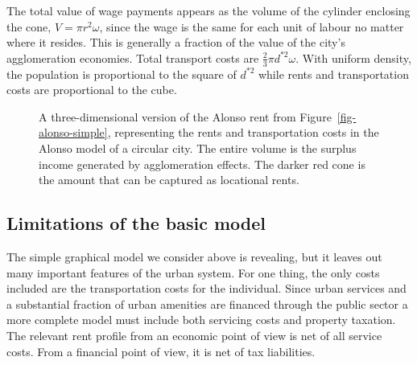 The total value of wage payments appears as the volume of the cylinder enclosing the cone, $V=\pi r^2 \omega$, since the wage is the same for each unit of labour no matter where it resides. This is generally a fraction of the value of the city's agglomeration economies. 
Total transport costs are $\frac{2}{3}\pi  d^{*2} \omega$. 
With uniform density, the population is proportional to the square of  $d^{*2}$ while rents and transportation costs are proportional to the cube. %


\begin{figure}
    \begin{center}
    
    \caption[A three-dimensional version of the Alonso model.]{A three-dimensional version of the Alonso rent from Figure~\ref{fig-alonso-simple}, representing the rents and transportation costs in the Alonso model of a circular city. The entire volume is the surplus income generated by agglomeration effects. The darker red cone is the amount that can be captured as locational rents.}
    \label{fig-city-conical}
    \end{center}
\end{figure}




 
\subsection{Limitations of the basic model}
The simple graphical model we consider above is revealing, but it leaves out many important features of the urban system. For one thing, the only costs included are the transportation costs for the individual.  Since urban services and  a substantial fraction of urban amenities are financed through the public sector a more complete model must include both servicing costs and property taxation. The relevant rent profile from an economic point of view is net of all service costs. From a financial point of view, it is net of tax liabilities.%


